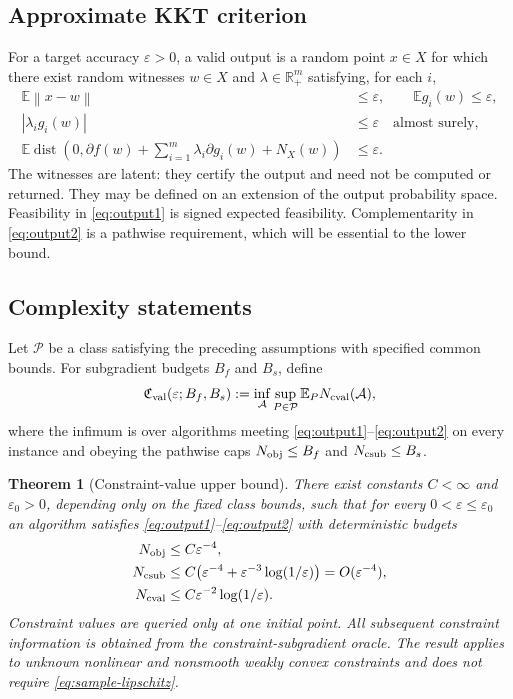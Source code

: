 \documentclass[11pt,a4paper]{article}
\newcommand{\R}{\mathbb R}
\newcommand{\E}{\mathbb E}
\newcommand{\eps}{\varepsilon}
\newcommand{\norm}[1]{\left\lVert#1\right\rVert}
\DeclareMathOperator{\dist}{dist}
\newtheorem{theorem}{Theorem}[section]
\theoremstyle{remark}
\numberwithin{equation}{section}
\begin{document}
\subsection{Approximate KKT criterion}
For a target accuracy $\eps>0$, a valid output is a random point $x\in X$ for which there exist random witnesses $w\in X$ and $\lambda\in\R_+^m$ satisfying, for each $i$,
\begin{align}
 \E\norm{x-w}&\le\eps,\qquad \E g_i(w)\le\eps,\label{eq:output1}\\
 |\lambda_i g_i(w)|&\le\eps\quad\text{almost surely},\nonumber\\
 \E\dist\!\left(0,\partial f(w)+\sum_{i=1}^m\lambda_i\partial g_i(w)+N_X(w)\right)&\le\eps.
 \label{eq:output2}
\end{align}
The witnesses are latent: they certify the output and need not be computed or returned. They may be defined on an extension of the output probability space. Feasibility in \eqref{eq:output1} is signed expected feasibility. Complementarity in \eqref{eq:output2} is a pathwise requirement, which will be essential to the lower bound.

\subsection{Complexity statements}
Let $\mathcal P$ be a class satisfying the preceding assumptions with specified common bounds. For subgradient budgets $B_f$ and $B_s$, define
\begin{equation}
 \mathfrak C_{\rm val}(\eps;B_f,B_s)
 :=\inf_{\mathcal A}\sup_{P\in\mathcal P}\E_P N_{\rm cval}(\mathcal A),
 \label{eq:minimax}
\end{equation}
where the infimum is over algorithms meeting \eqref{eq:output1}--\eqref{eq:output2} on every instance and obeying the pathwise caps $N_{\rm obj}\le B_f$ and $N_{\rm csub}\le B_s$.

\begin{theorem}[Constraint-value upper bound]\label{thm:upper}
There exist constants $C<\infty$ and $\eps_0>0$, depending only on the fixed class bounds, such that for every $0<\eps\le\eps_0$ an algorithm satisfies \eqref{eq:output1}--\eqref{eq:output2} with deterministic budgets
\begin{align}
 N_{\rm obj}&\le C\eps^{-4},\nonumber\\
 N_{\rm csub}&\le C\bigl(\eps^{-4}+\eps^{-3}\log(1/\eps)\bigr)
             =O(\eps^{-4}),\label{eq:mainupper}\\
 N_{\rm cval}&\le C\eps^{-2}\log(1/\eps).\nonumber
\end{align}
Constraint values are queried only at one initial point. All subsequent constraint information is obtained from the constraint-subgradient oracle. The result applies to unknown nonlinear and nonsmooth weakly convex constraints and does not require \eqref{eq:sample-lipschitz}.
\end{theorem}
\end{document}
